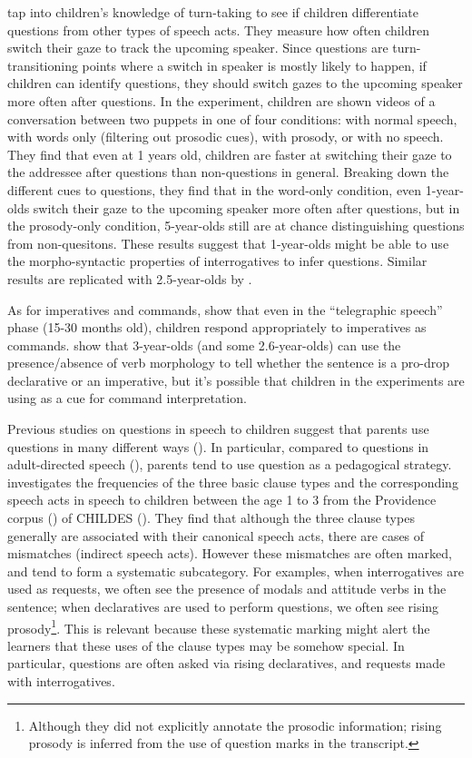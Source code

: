 \textcite{casillas2017turn} tap into children's knowledge of turn-taking to see if children differentiate questions from other types of speech acts. They measure how often children switch their gaze to track the upcoming speaker. Since questions are turn-transitioning points where a switch in speaker is mostly likely to happen, if children can identify questions, they should switch gazes to the upcoming speaker more often after questions. In the experiment, children are shown videos of a conversation between two puppets in one of four conditions: with normal speech, with words only (filtering out prosodic cues), with prosody, or with no speech. They find that even at 1 years old, children are faster at switching their gaze to the addressee after questions than non-questions in general. Breaking down the different cues to questions, they find that in the word-only condition, even 1-year-olds switch their gaze to the upcoming speaker more often after questions, but in the prosody-only condition, 5-year-olds still are at chance distinguishing questions from non-quesitons. These results suggest that 1-year-olds might be able to use the morpho-syntactic properties of interrogatives to infer questions. Similar results are replicated with 2.5-year-olds by \textcite{lammertink2015turn}.


As for imperatives and commands, \textcite{shipley1969} show that even in the ``telegraphic speech'' phase (15-30 months old), children respond appropriately to imperatives as commands. \textcite{orfitellihyams2012subj} show that 3-year-olds (and some 2.6-year-olds) can use the presence/absence of verb morphology to tell whether the sentence is a pro-drop declarative or an imperative, but it's possible that children in the experiments are using  as a cue for command interpretation. 

Previous studies on questions in speech to children suggest that parents use questions in many different ways (\citealt{holzman1972, shatz1979, tamir1980, yu2019pedagogical}). In particular, compared to questions in adult-directed speech (\citealt{stivers2010}), parents tend to use question as a pedagogical strategy. \citealt{zaitsu2020} investigates the frequencies of the three basic clause types and the corresponding speech acts in speech to children between the age 1 to 3 from the Providence corpus (\citealt{ProvidenceCorpus}) of CHILDES (\citealt{CHILDES}). They find that although the three clause types generally are associated with their canonical speech acts, there are cases of mismatches (indirect speech acts). However these mismatches are often marked, and tend to form a systematic subcategory. For examples, when interrogatives are used as requests, we often see the presence of modals and attitude verbs in the sentence; when declaratives are used to perform questions, we often see rising prosody\footnote{Although they did not explicitly annotate the prosodic information; rising prosody is inferred from the use of question marks in the transcript.}. This is relevant because these systematic marking might alert the learners that these uses of the clause types may be somehow special. In particular, questions are often asked via rising declaratives, and requests made with interrogatives. 



